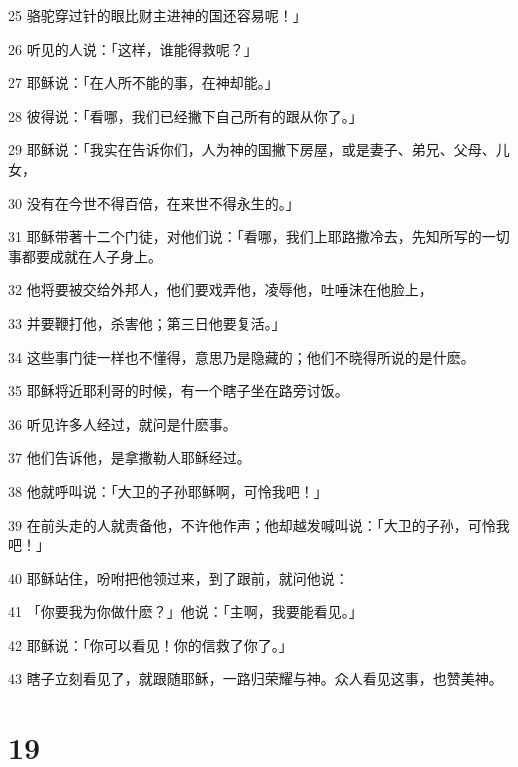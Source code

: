 \par 25 骆驼穿过针的眼比财主进神的国还容易呢！」
\par 26 听见的人说：「这样，谁能得救呢？」
\par 27 耶稣说：「在人所不能的事，在神却能。」
\par 28 彼得说：「看哪，我们已经撇下自己所有的跟从你了。」
\par 29 耶稣说：「我实在告诉你们，人为神的国撇下房屋，或是妻子、弟兄、父母、儿女，
\par 30 没有在今世不得百倍，在来世不得永生的。」
\par 31 耶稣带著十二个门徒，对他们说：「看哪，我们上耶路撒冷去，先知所写的一切事都要成就在人子身上。
\par 32 他将要被交给外邦人，他们要戏弄他，凌辱他，吐唾沫在他脸上，
\par 33 并要鞭打他，杀害他；第三日他要复活。」
\par 34 这些事门徒一样也不懂得，意思乃是隐藏的；他们不晓得所说的是什麽。
\par 35 耶稣将近耶利哥的时候，有一个瞎子坐在路旁讨饭。
\par 36 听见许多人经过，就问是什麽事。
\par 37 他们告诉他，是拿撒勒人耶稣经过。
\par 38 他就呼叫说：「大卫的子孙耶稣啊，可怜我吧！」
\par 39 在前头走的人就责备他，不许他作声；他却越发喊叫说：「大卫的子孙，可怜我吧！」
\par 40 耶稣站住，吩咐把他领过来，到了跟前，就问他说：
\par 41 「你要我为你做什麽？」他说：「主啊，我要能看见。」
\par 42 耶稣说：「你可以看见！你的信救了你了。」
\par 43 瞎子立刻看见了，就跟随耶稣，一路归荣耀与神。众人看见这事，也赞美神。

\chapter{19}

